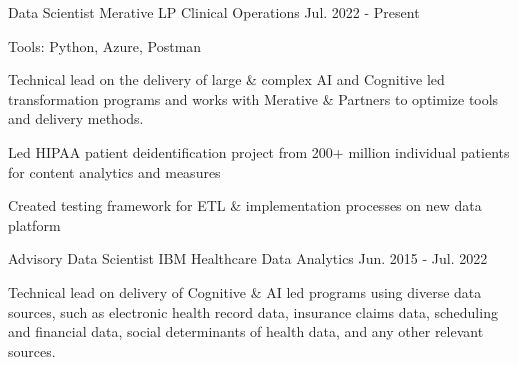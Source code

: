 

\begin{cventries}

  \cvexpentry
    {Data Scientist} %
    {Merative LP}
    {Clinical Operations} %
    {Jul. 2022 - Present}
    {
      \begin{cvheavyparagraph}
        Tools: Python, Azure, Postman
      \end{cvheavyparagraph}
    }
    {
      \begin{cvparagraph}
        Technical lead on the delivery of large \& complex AI and Cognitive led transformation programs and works with Merative \& Partners to optimize tools and delivery methods.
      \end{cvparagraph}
      \begin{cvitems}
        \item {Led HIPAA patient deidentification project from 200+ million individual patients for content analytics and measures}
        \item {Created testing framework for ETL \& implementation processes on new data platform}
      \end{cvitems}
    }
  \cventry
    {Advisory Data Scientist} %
    {IBM} %
    {Healthcare Data Analytics} %
    {Jun. 2015 - Jul. 2022} %
    {
      \begin{cvcompactparagraph}
        Technical lead on delivery of Cognitive \& AI led programs using diverse data sources, such as electronic health record data, insurance claims data, scheduling and financial data, social determinants of health data, and any other relevant sources.
      \end{cvcompactparagraph}
    }


\end{cventries}
